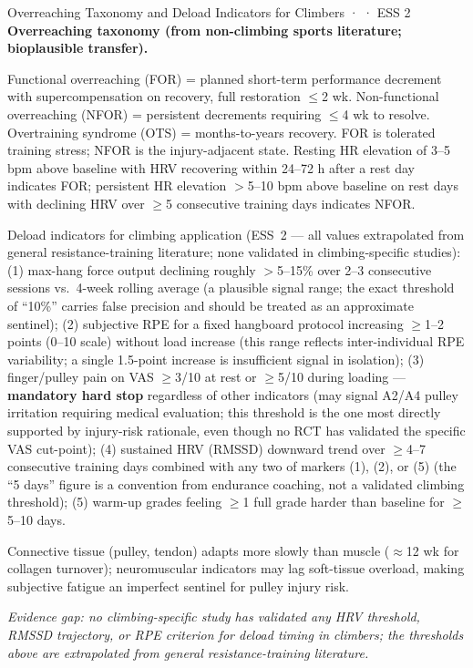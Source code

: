 \begin{bioplausbox}{Overreaching Taxonomy and Deload Indicators for Climbers · \bioplausible · ESS 2}
\textbf{Overreaching taxonomy (from non-climbing sports literature; bioplausible transfer).}

Functional overreaching (FOR) = planned short-term performance decrement with supercompensation on recovery, full restoration $\leq$2 wk. Non-functional overreaching (NFOR) = persistent decrements requiring $\leq$4 wk to resolve. Overtraining syndrome (OTS) = months-to-years recovery. FOR is tolerated training stress; NFOR is the injury-adjacent state. Resting HR elevation of 3–5 bpm above baseline with HRV recovering within 24–72 h after a rest day indicates FOR; persistent HR elevation $>$5–10 bpm above baseline on rest days with declining HRV over $\geq$5 consecutive training days indicates NFOR.

Deload indicators for climbing application (ESS~2 — all values extrapolated from general resistance-training literature; none validated in climbing-specific studies): (1) max-hang force output declining roughly $>$5--15\% over 2--3 consecutive sessions vs.\ 4-week rolling average (a plausible signal range; the exact threshold of ``10\%'' carries false precision and should be treated as an approximate sentinel); (2) subjective RPE for a fixed hangboard protocol increasing $\geq$1--2 points (0--10 scale) without load increase (this range reflects inter-individual RPE variability; a single 1.5-point increase is insufficient signal in isolation); (3) finger/pulley pain on VAS $\geq$3/10 at rest or $\geq$5/10 during loading — \textbf{mandatory hard stop} regardless of other indicators (may signal A2/A4 pulley irritation requiring medical evaluation; this threshold is the one most directly supported by injury-risk rationale, even though no RCT has validated the specific VAS cut-point); (4) sustained HRV (RMSSD) downward trend over $\geq$4--7 consecutive training days combined with any two of markers (1), (2), or (5) (the ``5 days'' figure is a convention from endurance coaching, not a validated climbing threshold); (5) warm-up grades feeling $\geq$1 full grade harder than baseline for $\geq$5--10 days.

Connective tissue (pulley, tendon) adapts more slowly than muscle ($\approx$12 wk for collagen turnover); neuromuscular indicators may lag soft-tissue overload, making subjective fatigue an imperfect sentinel for pulley injury risk.

\textit{Evidence gap: no climbing-specific study has validated any HRV threshold, RMSSD trajectory, or RPE criterion for deload timing in climbers; the thresholds above are extrapolated from general resistance-training literature.}
\end{bioplausbox}

